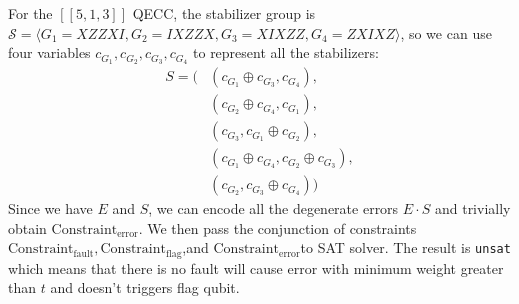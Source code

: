 \documentclass[acmsmallw,review]{acmart}
\begin{document}
For the $[[5,1,3]] $ QECC, the stabilizer group is $\mathcal{S} = \langle G_1= XZZXI, G_2 = IXZZX , G_3= XIXZZ, G_4 = ZXIXZ \rangle$, so we can use four variables $c_{G_1}, c_{G_2}, c_{G_3}, c_{G_4}$ to represent all the stabilizers:
\begin{equation}
\begin{aligned}
S = \big( & (c_{G_1} \oplus c_{G_3}, c_{G_4}), \\
       & (c_{G_2} \oplus c_{G_4}, c_{G_1}), \\
       & (c_{G_3}, c_{G_1} \oplus c_{G_2}), \\
       & (c_{G_1} \oplus c_{G_4}, c_{G_2} \oplus c_{G_3}), \\
       & (c_{G_2}, c_{G_3} \oplus c_{G_4}) \big)
\end{aligned}
\end{equation}
Since we have $E$ and $S$, we can encode all the degenerate errors $E \cdot S$ and trivially obtain $\mathrm{Constraint}_{\mathrm{error}}$. We then pass the conjunction of  constraints $\mathrm{Constraint}_{\mathrm{fault}},  \mathrm{Constraint}_{\mathrm{flag}}$,and $\mathrm{Constraint}_{\mathrm{error}}$to  SAT solver.
The result  is \texttt{unsat} which means that there is no fault will cause error with minimum weight greater than $t $ and doesn't triggers flag qubit.
\end{document}
